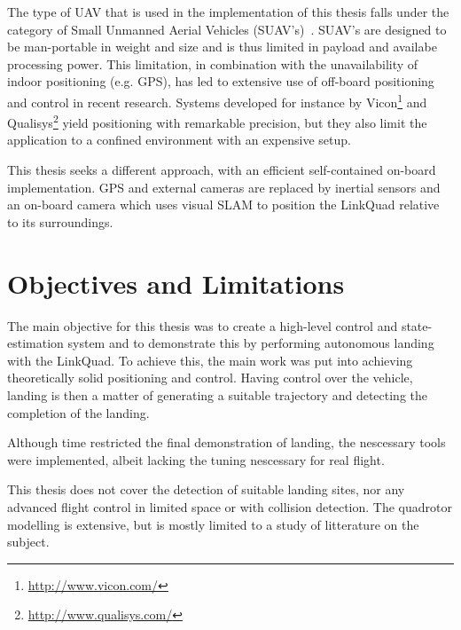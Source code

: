     The type of UAV that is used in the implementation of this thesis
    falls under the category of Small Unmanned Aerial Vehicles (SUAV's)~\citep{valavanis2007advances}.
    SUAV's are designed to be man-portable in weight and size and is thus
    limited in payload and availabe processing power.
    This limitation, in combination with the unavailability of indoor positioning (e.g. GPS),
    has led to extensive use of off-board positioning and control in recent research.
    Systems developed for instance by Vicon\footnote{\url{http://www.vicon.com/}} and
    Qualisys\footnote{\url{http://www.qualisys.com/}} yield positioning with
    remarkable precision, but they also limit the application to a confined
    environment with an expensive setup.

    This thesis seeks a different approach, with an efficient self-contained
    on-board implementation. GPS and external cameras are replaced by inertial sensors and an
    on-board camera which uses visual SLAM to position the LinkQuad relative to
    its surroundings.








\section{Objectives and Limitations}
    The main objective for this thesis was to create a high-level control and state-estimation
    system and to demonstrate this by performing autonomous landing with the LinkQuad.
    To achieve this, the main work was put into achieving theoretically solid positioning and control.
    Having control over the vehicle, landing is then a matter of generating
    a suitable trajectory and detecting the completion of the landing.

    Although time restricted the final demonstration of landing, the nescessary tools
    were implemented, albeit lacking the tuning nescessary for real flight.

    This thesis does not cover the detection of suitable landing sites,
    nor any advanced flight control in limited space or with collision detection.
    The quadrotor modelling is extensive, but is mostly limited to a study
    of litterature on the subject.

